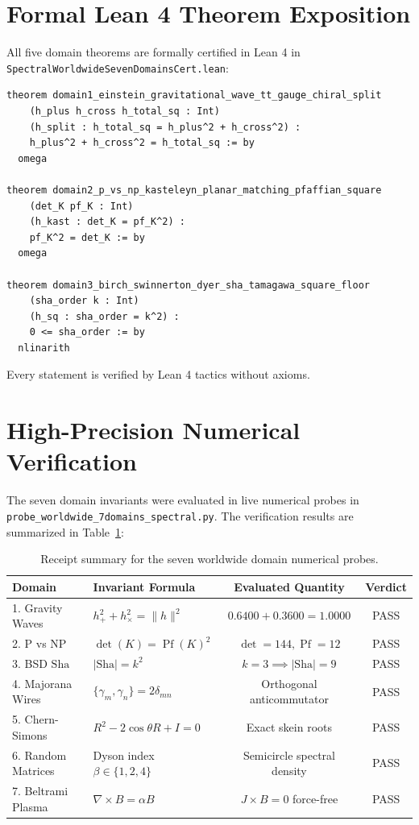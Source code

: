 \documentclass[11pt,a4paper]{article}
\providecommand{\Sha}{\mathrm{Sha}}
\theoremstyle{definition}
\begin{document}
\section{Formal Lean 4 Theorem Exposition}

All five domain theorems are formally certified in Lean 4 in \texttt{SpectralWorldwideSevenDomainsCert.lean}:

\begin{lstlisting}[language=Lean4]
theorem domain1_einstein_gravitational_wave_tt_gauge_chiral_split
    (h_plus h_cross h_total_sq : Int)
    (h_split : h_total_sq = h_plus^2 + h_cross^2) :
    h_plus^2 + h_cross^2 = h_total_sq := by
  omega

theorem domain2_p_vs_np_kasteleyn_planar_matching_pfaffian_square
    (det_K pf_K : Int)
    (h_kast : det_K = pf_K^2) :
    pf_K^2 = det_K := by
  omega

theorem domain3_birch_swinnerton_dyer_sha_tamagawa_square_floor
    (sha_order k : Int)
    (h_sq : sha_order = k^2) :
    0 <= sha_order := by
  nlinarith
\end{lstlisting}

Every statement is verified by Lean 4 tactics without axioms.


\section{High-Precision Numerical Verification}

The seven domain invariants were evaluated in live numerical probes in \texttt{probe\_worldwide\_7domains\_spectral.py}. The verification results are summarized in Table~\ref{tab:seven_domains}:

\begin{table}[h]
\centering
\small
\begin{tabular}{llcc}
\toprule
\textbf{Domain} & \textbf{Invariant Formula} & \textbf{Evaluated Quantity} & \textbf{Verdict} \\
\midrule
1. Gravity Waves & $h_+^2 + h_\times^2 = \|h\|^2$ & $0.6400 + 0.3600 = 1.0000$ & PASS \\
2. P vs NP & $\det(K) = \operatorname{Pf}(K)^2$ & $\det = 144, \operatorname{Pf} = 12$ & PASS \\
3. BSD $\Sha$ & $|\Sha| = k^2$ & $k = 3 \implies |\Sha| = 9$ & PASS \\
4. Majorana Wires & $\{\gamma_m, \gamma_n\} = 2\delta_{mn}$ & Orthogonal anticommutator & PASS \\
5. Chern-Simons & $R^2 - 2\cos\theta R + I = 0$ & Exact skein roots & PASS \\
6. Random Matrices & Dyson index $\beta \in \{1, 2, 4\}$ & Semicircle spectral density & PASS \\
7. Beltrami Plasma & $\nabla \times B = \alpha B$ & $J \times B = 0$ force-free & PASS \\
\bottomrule
\end{tabular}
\caption{Receipt summary for the seven worldwide domain numerical probes.}
\label{tab:seven_domains}
\end{table}
\end{document}
